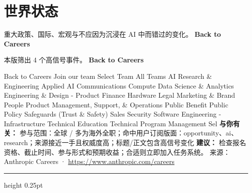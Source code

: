 \documentclass[10.5pt]{ctexart}
\begin{document}
\section*{世界状态}
{\color{ormuted} 重大政策、国际、宏观与不应因为沉浸在 AI 中而错过的变化。}
\vspace{2mm}
{\LARGE\bfseries Back to Careers}\par
\vspace{1mm}
{\color{ormuted} 本版筛出 4 个高信号事件。}
\vspace{3mm}
{\Large\bfseries Back to Careers}\par
Back to Careers Join our team Select Team All Teams AI Research \& Engineering Applied AI Communications Compute Data Science \& Analytics Engineering \& Design - Product Finance Hardware Legal Marketing \& Brand People Product Management, Support, \& Operations Public Benefit Public Policy Safeguards (Trust \& Safety) Sales Security Software Engineering - Infrastructure Technical Education Technical Program Management Sel
\textbf{与你有关：} 参与范围：全球 / 多为海外全职；命中用户订阅版面：opportunity、ai、research；来源接近一手且权威度高；标题/正文包含高信号变化
\textbf{建议：} 检查报名资格、截止时间、参与形式和预期收益；合适则立即加入任务系统。
{\footnotesize\color{ormuted} 来源：Anthropic Careers · \url{https://www.anthropic.com/careers}}
\vspace{4mm}
\hrule height 0.25pt
\vspace{3mm}
\end{document}
